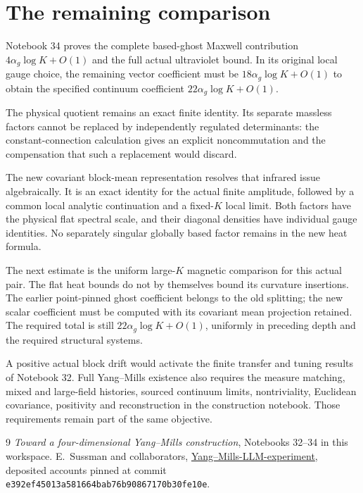 \section{The remaining comparison}

Notebook 34 proves the complete based-ghost Maxwell
contribution \(4\alpha_g\log K+O(1)\) and the full
actual ultraviolet bound. In its original local
gauge choice, the remaining vector coefficient
must be \(18\alpha_g\log K+O(1)\) to obtain the
specified continuum coefficient
\(22\alpha_g\log K+O(1)\).

The physical quotient remains an exact finite
identity. Its separate massless factors cannot be
replaced by independently regulated determinants:
the constant-connection calculation gives an
explicit noncommutation and the compensation
that such a replacement would discard.

The new covariant block-mean representation resolves
that infrared issue algebraically. It is an exact
identity for the actual finite amplitude, followed
by a common local analytic continuation and a
fixed-\(K\) local limit. Both factors have the
physical flat spectral scale, and their diagonal
densities have individual gauge identities.
No separately singular globally based factor
remains in the new heat formula.

The next estimate is the uniform large-\(K\)
magnetic comparison for this actual pair. The
flat heat bounds do not by themselves bound
its curvature insertions. The earlier point-pinned
ghost coefficient belongs to the old splitting;
the new scalar coefficient must be computed
with its covariant mean projection retained.
The required total is still
\(22\alpha_g\log K+O(1)\), uniformly in preceding
depth and the required structural systems.

A positive actual block drift would activate the
finite transfer and tuning results of Notebook 32.
Full Yang--Mills existence also requires the
measure matching, mixed and large-field histories,
sourced continuum limits, nontriviality, Euclidean
covariance, positivity and reconstruction in the
construction notebook. Those requirements remain
part of the same objective.

\begin{thebibliography}{9}
\emph{Toward a four-dimensional Yang--Mills construction},
Notebooks 32--34 in this workspace.
E.~Sussman and collaborators,
\href{https://github.com/ethanwsussman/Yang--Mills-LLM-experiment}
{Yang--Mills-LLM-experiment}, deposited accounts pinned at
commit \texttt{e392ef45013a581664bab76b90867170b30fe10e}.
\end{thebibliography}

